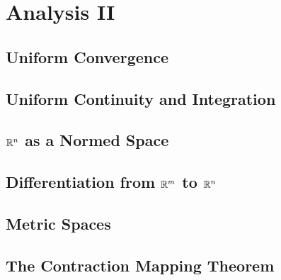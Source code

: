 \documentclass[main.tex]{subfiles}
\begin{document}
\chapter{Analysis II}
	\section{Uniform Convergence}
	
	\section{Uniform Continuity and Integration}
	
	\section{$\mathbb R^n$ as a Normed Space}
	
	\section{Differentiation from $\mathbb R^m$ to $\mathbb R^n$}
	
	\section{Metric Spaces}
	
	\section{The Contraction Mapping Theorem}
				
\end{document}
